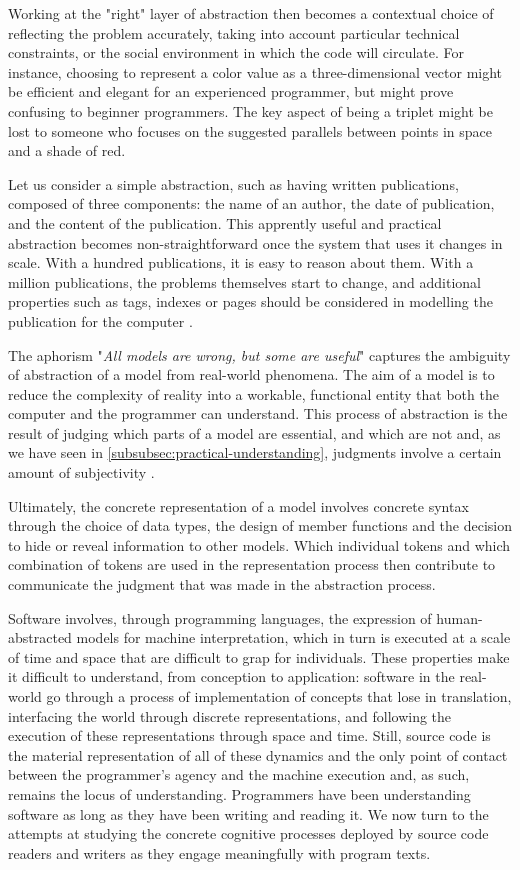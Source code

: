 Working at the "right" layer of abstraction then becomes a contextual choice of reflecting the problem accurately, taking into account particular technical constraints, or the social environment in which the code will circulate. For instance, choosing to represent a color value as a three-dimensional vector might be efficient and elegant for an experienced programmer, but might prove confusing to beginner programmers. The key aspect of being a triplet might be lost to someone who focuses on the suggested parallels between points in space and a shade of red.

Let us consider a simple abstraction, such as having written publications, composed of three components: the name of an author, the date of publication, and the content of the publication. This apprently useful and practical abstraction becomes non-straightforward once the system that uses it changes in scale. With a hundred publications, it is easy to reason about them. With a million publications, the problems themselves start to change, and additional properties such as tags, indexes or pages should be considered in modelling the publication for the computer \citep{cities_peter_2022}.

The aphorism "\emph{All models are wrong, but some are useful}" \citep{box_science_1976} captures the ambiguity of abstraction of a model from real-world phenomena. The aim of a model is to reduce the complexity of reality into a workable, functional entity that both the computer and the programmer can understand. This process of abstraction is the result of judging which parts of a model are essential, and which are not and, as we have seen in \ref{subsubsec:practical-understanding}, judgments involve a certain amount of subjectivity \citep{weizenbaum_computer_1976}.

Ultimately, the concrete representation of a model involves concrete syntax through the choice of data types, the design of member functions and the decision to hide or reveal information to other models. Which individual tokens and which combination of tokens are used in the representation process then contribute to communicate the judgment that was made in the abstraction process.

\spacersmall

Software involves, through programming languages, the expression of human-abstracted models for machine interpretation, which in turn is executed at a scale of time and space that are difficult to grap for individuals. These properties make it difficult to understand, from conception to application: software in the real-world go through a process of implementation of concepts that lose in translation, interfacing the world through discrete representations, and following the execution of these representations through space and time. Still, source code is the material representation of all of these dynamics and the only point of contact between the programmer's agency and the machine execution and, as such, remains the locus of understanding. Programmers have been understanding software as long as they have been writing and reading it. We now turn to the attempts at studying the concrete cognitive processes deployed by source code readers and writers as they engage meaningfully with program texts.

